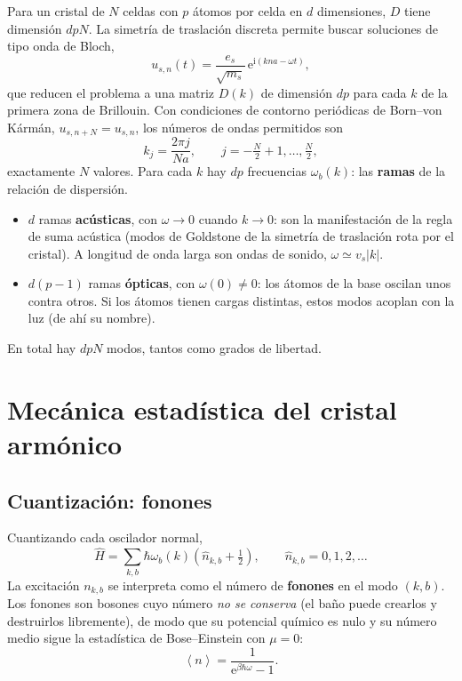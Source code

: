 \documentclass[11pt,a4paper]{article}
\newcommand{\ii}{\mathrm{i}}
\newcommand{\ee}{\mathrm{e}}
\newcommand{\avg}[1]{\left\langle #1\right\rangle}
\newcommand{\vs}{v_{s}}
\begin{document}
Para un cristal de $N$ celdas con $p$ átomos por celda en $d$ dimensiones, $D$
tiene dimensión $dpN$. La simetría de traslación discreta permite buscar
soluciones de tipo onda de Bloch,
\begin{equation}
u_{s,n}(t)=\frac{e_s}{\sqrt{m_s}}\,\ee^{\ii(kna-\omega t)},
\end{equation}
que reducen el problema a una matriz $D(k)$ de dimensión $dp$ para cada $k$
de la primera zona de Brillouin. Con condiciones de contorno periódicas de
Born–von Kármán, $u_{s,n+N}=u_{s,n}$, los números de ondas permitidos son
\begin{equation}
k_j=\frac{2\pi j}{Na},\qquad j=-\tfrac N2+1,\dots,\tfrac N2,
\end{equation}
exactamente $N$ valores. Para cada $k$ hay $dp$ frecuencias $\omega_b(k)$:
las \textbf{ramas} de la relación de dispersión.
\begin{itemize}
\item $d$ ramas \textbf{acústicas}, con $\omega\to0$ cuando $k\to0$: son la
  manifestación de la regla de suma acústica (modos de Goldstone de la simetría
  de traslación rota por el cristal). A longitud de onda larga son ondas de
  sonido, $\omega\simeq \vs |k|$.
\item $d(p-1)$ ramas \textbf{ópticas}, con $\omega(0)\neq0$: los átomos de la
  base oscilan unos contra otros. Si los átomos tienen cargas distintas, estos
  modos acoplan con la luz (de ahí su nombre).
\end{itemize}
En total hay $dpN$ modos, tantos como grados de libertad.

\section{Mecánica estadística del cristal armónico}

\subsection{Cuantización: fonones}

Cuantizando cada oscilador normal,
\begin{equation}
\hat H=\sum_{k,b}\hbar\omega_b(k)\left(\hat n_{k,b}+\tfrac12\right),
\qquad \hat n_{k,b}=0,1,2,\dots
\end{equation}
La excitación $n_{k,b}$ se interpreta como el número de \textbf{fonones} en el
modo $(k,b)$. Los fonones son bosones cuyo número \emph{no se conserva} (el
baño puede crearlos y destruirlos libremente), de modo que su potencial químico
es nulo y su número medio sigue la estadística de Bose–Einstein con $\mu=0$:
\begin{equation}
\avg{n}=\frac{1}{\ee^{\beta\hbar\omega}-1}.
\end{equation}
\end{document}
